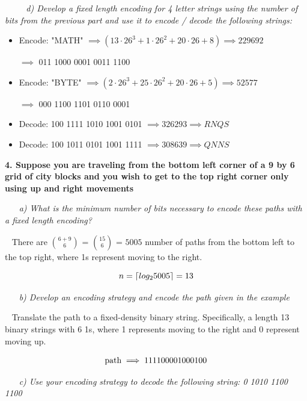 \documentclass[12pt, letterpaper]{article}
\DeclarePairedDelimiter{\ceil}{\lceil}{\rceil}
\begin{document}
\-\ \newline
\-\ \newline
\-\ \it{ d) Develop a fixed length encoding for 4 letter strings using the number of bits from the previous part and use it to encode / decode the following strings: }
\begin{itemize} 
\item Encode: "MATH"
\( \implies (13 \cdot 26^3 + 1 \cdot 26^2 + 20 \cdot 26 + 8) \implies 229692 \)

\( \implies \) 011 1000 0001 0011 1100 \newline


\item Encode: "BYTE"
\( \implies (2\cdot26^3 + 25\cdot 26^2 + 20\cdot 26 + 5) \implies 52577\)

\( \implies \) 000 1100 1101 0110 0001 \newline

\item Decode: 100 1111 1010 1001 0101
\( \implies 326293 \implies RNQS \)

\item Decode: 100 1011 0101 1001 1111
\( \implies 308639 \implies QNNS \)

\end{itemize}


\newpage
\bf{ 4. Suppose you are traveling from the bottom left corner of a 9 by 6 grid of city blocks and you wish to get to the top right corner only using up and right movements }

\-\ \newline
\-\ \it{ a) What is the minimum number of bits necessary to encode these paths with a fixed length encoding? }

\-\ \newline
\textnormal{There are \(6 + 9 \choose 6\) = \(15 \choose 6\) = \( 5005 \) number of paths from the bottom left to the top right, where 1s represent moving to the right.  }

\[ n = \ceil{ log_2{5005} } = 13 \]


\-\ \newline
\-\ \it{ b) Develop an encoding strategy and encode the path given in the example }

\-\ \newline
\textnormal{Translate the path to a fixed-density binary string. Specifically, a length 13 binary strings with 6 1s, where 1 represents moving to the right and 0 represent moving up.}

\[ \textnormal{path} \implies 1 1110 0001 0001 00 \]

\-\ \newline
\-\ \it{ c) Use your encoding strategy to decode the following string: 0 1010 1100 1100 }
\end{document}
